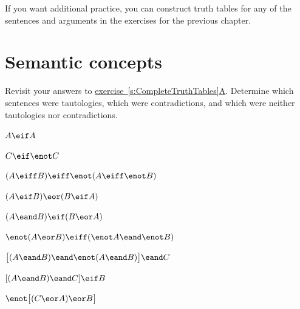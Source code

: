 If you want additional practice, you can construct truth tables for any of the sentences and arguments in the exercises for the previous chapter.



\chapter{Semantic concepts}\setcounter{ProbPart}{0}
\problempart
Revisit your answers to \hyperref[pr.TT.TTorC]{exercise~\ref*{s:CompleteTruthTables}A}. Determine which sentences were tautologies, which were contradictions, and which were neither tautologies nor contradictions.
\begin{compactlist}
\item $A \eif A$ \hfill {}
\item $C \eif\enot C$ \hfill {}
\item $(A \eiff B) \eiff \enot(A\eiff \enot B)$  \hfill {}
\item $(A \eif B) \eor (B \eif A)$  \hfill {}
\item $(A \eand B) \eif (B \eor A)$  \hfill {}
\item $\enot(A \eor B) \eiff (\enot A \eand \enot B)$ \hfill {}
\item $\bigl[(A\eand B) \eand\enot(A\eand B)\bigr] \eand C$  \hfill {}
\item $[(A \eand B) \eand C] \eif B$  \hfill {}
\item $\enot\bigl[(C\eor A) \eor B\bigr]$  \hfill {}
\end{compactlist}

\

